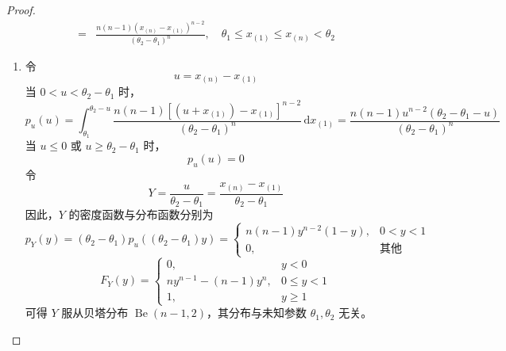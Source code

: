 \documentclass[normal,founder,mtpro2,cn]{elegantnote}
\begin{document}
\begin{enumerate}
\begin{proof}
\begin{equation*}
\begin{aligned}
                    =                                   & \frac{n(n-1)\left(x_{(n)}-x_{(1)}\right)^{n-2}}{\left(\theta_{2}-\theta_{1}\right)^{n}},\quad\theta_{1}\leq x_{(1)}\leq x_{(n)}<\theta_{2}
                \end{aligned}
            \end{equation*}
            \begin{enumerate}
                \item 令
                      \begin{equation*}
                          u=x_{(n)}-x_{(1)}
                      \end{equation*}
                      当 $0<u<\theta_{2}-\theta_{1}$ 时，
                      \begin{equation*}
                          p_{u}(u)=\int_{\theta_{1}}^{\theta_{2}-u}\frac{n(n-1)\left[\left(u+x_{(1)}\right)-x_{(1)}\right]^{n-2}}{\left(\theta_{2}-\theta_{1}\right)^{n}}\,\mathrm{d}x_{(1)}=\frac{n(n-1)u^{n-2}\left(\theta_{2}-\theta_{1}-u\right)}{\left(\theta_{2}-\theta_{1}\right)^{n}}
                      \end{equation*}
                      当 $u\leq 0$ 或 $u\geq\theta_{2}-\theta_{1}$ 时，
                      \begin{equation*}
                          p_{u}(u)=0
                      \end{equation*}
                      令
                      \begin{equation*}
                          Y=\frac{u}{\theta_{2}-\theta_{1}}=\frac{x_{(n)}-x_{(1)}}{\theta_{2}-\theta_{1}}
                      \end{equation*}
                      因此，$Y$ 的密度函数与分布函数分别为
                      \begin{equation*}
                          p_{Y}(y)=\left(\theta_{2}-\theta_{1}\right)p_{u}\left(\left(\theta_{2}-\theta_{1}\right)y\right)=\left\{\begin{array}{ll}
                              n(n-1) y^{n-2}(1-y), & 0<y<1       \\
                              0,                   & \text{其他}
                          \end{array}\right.
                      \end{equation*}
                      \begin{equation*}
                          F_{Y}(y)=\left\{\begin{array}{ll}
                              0,                    & y<0       \\
                              ny^{n-1}-(n-1) y^{n}, & 0\leq y<1 \\
                              1,                    & y\geq 1
                          \end{array}\right.
                      \end{equation*}
                      可得 $Y$ 服从贝塔分布 $\operatorname{Be}(n-1,2)$，其分布与未知参数 $\theta_{1},\theta_{2}$ 无关。


\end{enumerate}
\end{proof}
\end{enumerate}
\end{document}
